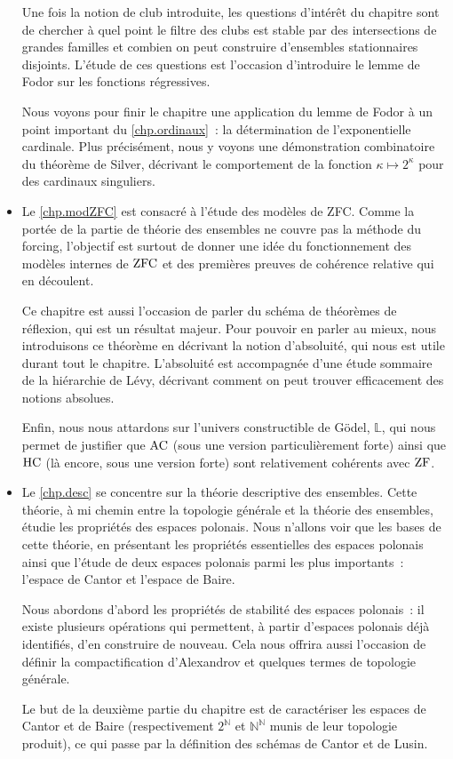 \begin{itemize}
  Une fois la notion de club introduite, les questions d'intérêt du chapitre
  sont de chercher à quel point le filtre des clubs est stable par des
  intersections de grandes familles et combien on peut construire d'ensembles
  stationnaires disjoints. L'étude de ces questions est l'occasion d'introduire
  le lemme de Fodor sur les fonctions régressives.

  Nous voyons pour finir le chapitre une application du lemme de Fodor à un
  point important du \cref{chp.ordinaux}~: la détermination de l'exponentielle
  cardinale. Plus précisément, nous y voyons une démonstration combinatoire du
  théorème de Silver, décrivant le comportement de la fonction
  $\kappa\mapsto 2^\kappa$ pour des cardinaux singuliers.
\item Le \cref{chp.modZFC} est consacré à l'étude des modèles de ZFC. Comme la
  portée de la partie de théorie des ensembles ne couvre pas la méthode du
  forcing, l'objectif est surtout de donner une idée du fonctionnement des
  modèles internes de $\operatorname{ZFC}$ et des premières preuves de cohérence relative qui
  en découlent.

  Ce chapitre est aussi l'occasion de parler du schéma de théorèmes de
  réflexion, qui est un résultat majeur. Pour pouvoir en parler au mieux, nous
  introduisons ce théorème en décrivant la notion d'absoluité, qui nous est
  utile durant tout le chapitre. L'absoluité est accompagnée d'une étude
  sommaire de la hiérarchie de Lévy, décrivant comment on peut trouver
  efficacement des notions absolues.

  Enfin, nous nous attardons sur l'univers constructible de Gödel, $\mathbb L$,
  qui nous permet de justifier que $\operatorname{AC}$ (sous une version particulièrement
  forte) ainsi que $\operatorname{HC}$ (là encore, sous une version forte) sont relativement
  cohérents avec $\operatorname{ZF}$.
\item Le \cref{chp.desc} se concentre sur la théorie descriptive des ensembles.
  Cette théorie, à mi chemin entre la topologie générale et la théorie des
  ensembles, étudie les propriétés des espaces polonais. Nous n'allons voir que
  les bases de cette théorie, en présentant les propriétés essentielles des
  espaces polonais ainsi que l'étude de deux espaces polonais parmi les plus
  importants~: l'espace de Cantor et l'espace de Baire.

  Nous abordons d'abord les propriétés de stabilité des espaces polonais~: il
  existe plusieurs opérations qui permettent, à partir d'espaces polonais déjà
  identifiés, d'en construire de nouveau. Cela nous offrira aussi l'occasion
  de définir la compactification d'Alexandrov et quelques termes de topologie
  générale.

  Le but de la deuxième partie du chapitre est de caractériser les espaces de
  Cantor et de Baire (respectivement $2^\mathbb N$ et $\mathbb N^\mathbb N$
  munis de leur topologie produit), ce qui passe par la définition des schémas
  de Cantor et de Lusin.
\end{itemize}

